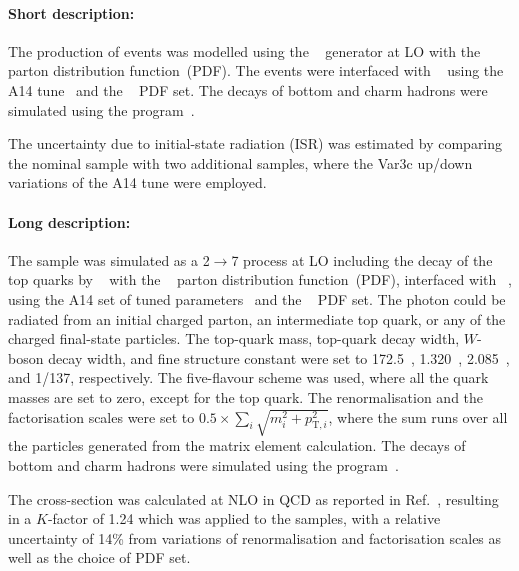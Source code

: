 \paragraph{Short description:}

The production of \ttgamma events was modelled using the \MGNLO[2.3.3]~\cite{Alwall:2014hca}
generator at LO with the \NNPDF[2.3lo]~\cite{Ball:2014uwa} parton distribution function~(PDF).
The events were interfaced with \PYTHIA[8.212]~\cite{Sjostrand:2014zea} using the A14 tune~\cite{ATL-PHYS-PUB-2014-021} and the
\NNPDF[2.3lo]~\cite{Ball:2014uwa} PDF set.
The decays of bottom and charm hadrons were simulated using the \EVTGEN[1.6.0] program~\cite{Lange:2001uf}.

The uncertainty due to initial-state radiation (ISR) was estimated by
comparing the nominal \ttgamma sample with two additional samples,
where the Var3c up/down variations of the A14 tune were employed.


\paragraph{Long description:}

The \ttgamma sample was simulated as a 2$\to$7 process at LO including the decay of the top quarks by
\MGNLO[2.3.3]~\cite{Alwall:2014hca} with the \NNPDF[2.3lo]~\cite{Ball:2014uwa} parton distribution function~(PDF), interfaced with
\PYTHIA[8.212]~\cite{Sjostrand:2014zea}, using the A14 set of tuned parameters~\cite{ATL-PHYS-PUB-2014-021} and the
\NNPDF[2.3lo]~\cite{Ball:2014uwa} PDF set. The photon could be radiated from an initial charged parton, an intermediate top quark, 
or any of the charged final-state particles. The top-quark mass, top-quark decay width, $W$-boson decay width, 
and fine structure constant were set to 172.5~\GeV, 1.320~\GeV, 2.085~\GeV, and 1/137, respectively.
The five-flavour scheme was used, where all the quark masses are set to zero, except for the top quark. The renormalisation and the
factorisation scales were set to $0.5\times \sum_i \sqrt{m^2_i+p^2_{\text{T},i}}$, where the sum runs over all the particles generated 
from the matrix element calculation.
The decays of bottom and charm hadrons were simulated using the \EVTGEN[1.6.0] program~\cite{Lange:2001uf}.

The cross-section was calculated at NLO in QCD as reported in Ref.~\cite{Melnikov:2011ta}, resulting in a $K$-factor of 1.24 which was applied 
to the samples, with a relative uncertainty of 14\% from variations of renormalisation and factorisation scales as well 
as the choice of PDF set.

